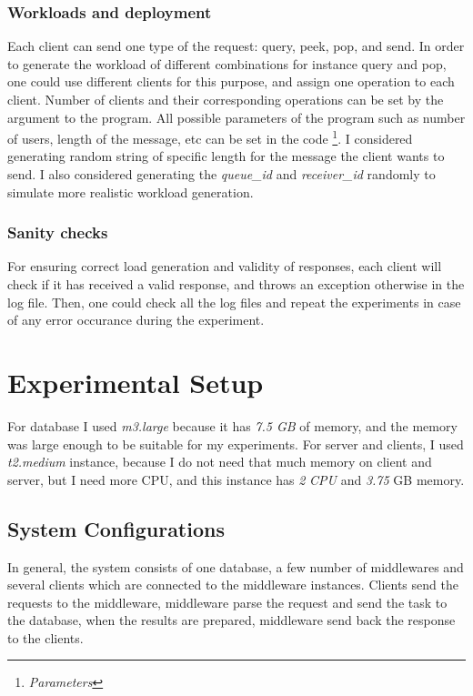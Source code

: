 \documentclass[11pt]{article}
\begin{document}
\subsubsection{Workloads and deployment}\label{sec:workloads-and-deployment}
Each client can send one type of the request: query, peek, pop, and send. In order to 
generate the workload of different combinations for instance query and pop, one 
could use different clients for this purpose, and assign one operation to 
each client. Number of clients and their corresponding
operations can be set by the argument to the program. All possible parameters of the 
program such as number of users, length of the message, etc can be set in the code
\footnote{\emph{Parameters}}. I considered generating random string of 
specific length for the message the client wants to send. I also considered generating
the \emph{queue\_id} and \emph{receiver\_id} randomly to simulate more realistic 
workload generation.

\subsubsection{Sanity checks}\label{sec:sanity-checks}
For ensuring correct load generation and validity of responses, each client will check
if it has received a valid response, and throws an exception otherwise in the log file.
Then, one could check all the log files and repeat the experiments in case of 
any error occurance during the experiment.

\section{Experimental Setup}\label{sec:experimental-setup}

For database I used \emph{m3.large} because it has \emph{7.5 GB} of memory, and the 
memory was large enough to be suitable for my experiments. 
For server and clients, I used \emph{t2.medium} instance, because I do not need that 
much memory on client and server, but I need more CPU, and this instance has \emph{2}
\emph{CPU} and \emph{3.75} GB memory. 

\subsection{System Configurations}\label{sec:system-configurations}
In general, the system consists of one database, a few number of middlewares 
and several clients which are connected to the middleware instances. Clients send the requests 
to the middleware, middleware parse the request and send the task to the database,
when the results are prepared, middleware send back the response to the clients. 
\end{document}
